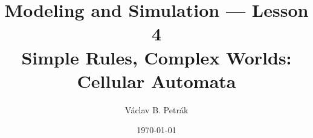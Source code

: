 \documentclass[11pt]{beamer}
\title{
Modeling and Simulation --- Lesson 4\\
\textbf{Simple Rules, Complex Worlds: 
Cellular Automata}}
\author{Václav B. Petrák}
\institute{Faculty of Biomedical Engineering\\
Czech Technical University}
\date{\today}
\begin{document}
\begin{frame}
\titlepage
\end{frame}




\end{document}
